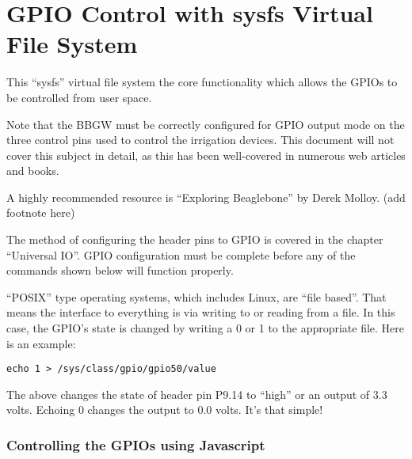 %
%
%

\chapter{GPIO Control with sysfs Virtual File System}

This ``sysfs'' virtual file system the core functionality which allows the 
GPIOs to be controlled from user space.

Note that the BBGW must be correctly configured for GPIO output mode on the 
three control pins used to control the irrigation devices.  This document will 
not cover this subject in detail, as this has been well-covered in numerous web 
articles and books.

A highly recommended resource is ``Exploring Beaglebone'' by Derek Molloy.
(add footnote here)

The method of configuring the header pins to GPIO is covered in the chapter 
``Universal IO''.  GPIO configuration must be complete before any of the 
commands shown below will function properly.

``POSIX'' type operating systems, which includes Linux, are ``file based''.  
That means the interface to everything is via writing to or reading from a 
file.  In this case, the GPIO's state is changed by writing a 0 or 1 to the 
appropriate file.  Here is an example:

\begin{verbatim}
echo 1 > /sys/class/gpio/gpio50/value
\end{verbatim}

The above changes the state of header pin P9.14 to ``high'' or an output of 3.3 
volts.  Echoing 0 changes the output to 0.0 volts.  It's that simple!

\subsection{Controlling the GPIOs using Javascript}

